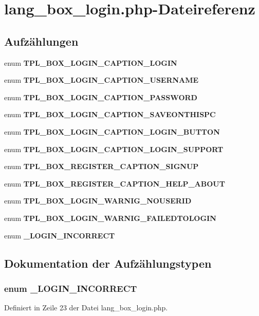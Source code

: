 \section{lang\_\-box\_\-login.php-Dateireferenz}
\label{lang__box__login_8php}
\subsection*{Aufzählungen}
\begin{CompactItemize}
\item 
enum {\bf TPL\_\-BOX\_\-LOGIN\_\-CAPTION\_\-LOGIN} 
\item 
enum {\bf TPL\_\-BOX\_\-LOGIN\_\-CAPTION\_\-USERNAME} 
\item 
enum {\bf TPL\_\-BOX\_\-LOGIN\_\-CAPTION\_\-PASSWORD} 
\item 
enum {\bf TPL\_\-BOX\_\-LOGIN\_\-CAPTION\_\-SAVEONTHISPC} 
\item 
enum {\bf TPL\_\-BOX\_\-LOGIN\_\-CAPTION\_\-LOGIN\_\-BUTTON} 
\item 
enum {\bf TPL\_\-BOX\_\-LOGIN\_\-CAPTION\_\-LOGIN\_\-SUPPORT} 
\item 
enum {\bf TPL\_\-BOX\_\-REGISTER\_\-CAPTION\_\-SIGNUP} 
\item 
enum {\bf TPL\_\-BOX\_\-REGISTER\_\-CAPTION\_\-HELP\_\-ABOUT} 
\item 
enum {\bf TPL\_\-BOX\_\-LOGIN\_\-WARNIG\_\-NOUSERID} 
\item 
enum {\bf TPL\_\-BOX\_\-LOGIN\_\-WARNIG\_\-FAILEDTOLOGIN} 
\item 
enum {\bf \_\-LOGIN\_\-INCORRECT} 
\end{CompactItemize}


\subsection{Dokumentation der Aufzählungstypen}
\subsubsection{\setlength{\rightskip}{0pt plus 5cm}enum {\bf \_\-LOGIN\_\-INCORRECT}}\label{lang__box__login_8php_62c9123ef7605f58073e9dd368f20412}




Definiert in Zeile 23 der Datei lang\_\-box\_\-login.php.
